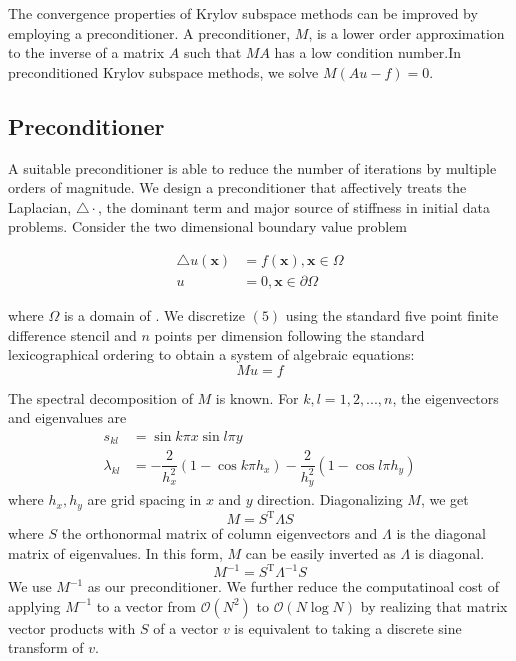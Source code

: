 \documentclass[12pt]{article}
\begin{document}
\begin{multicols}{2}
The convergence properties of Krylov subspace methods can be improved by employing a preconditioner. A preconditioner, $M$, is a lower order approximation to the inverse of a matrix $A$ such that $MA$ has a low condition number.In preconditioned Krylov subspace methods, we solve $M(Au-f)=0$.

\subsection{Preconditioner}
A suitable preconditioner is able to reduce the number of iterations by multiple orders of magnitude. We design a preconditioner that affectively treats the Laplacian, $\triangle\cdot$, the dominant term and major source of stiffness in initial data problems. Consider the two dimensional boundary value problem

\begin{align}
    \triangle u(\mathbf{x}) &= f(\mathbf{x}), \mathbf{x}\in\Omega \\
    u &= 0, \mathbf{x}\in\partial\Omega
\end{align}

where $\Omega$ is a domain of . We discretize $(5)$ using the standard five point finite difference stencil and $n$ points per dimension following the standard lexicographical ordering to obtain a system of algebraic equations:
\begin{equation}
    Mu = f
\end{equation}

The spectral decomposition of $M$ is known. For $k,l=1,2,...,n$, the eigenvectors and eigenvalues are
\begin{align}
    s_{kl} &= \sin{k\pi x}\sin{l\pi y} \\
    \lambda_{kl} &= -\dfrac{2}{h_x^2}(1-\cos{k\pi h_x}) -\dfrac{2}{h_y^2}(1-\cos{l\pi h_y})
\end{align}
where $h_x,h_y$ are grid spacing in $x$ and $y$ direction.
Diagonalizing $M$, we get
\begin{equation}
    M = S^\text{T} \Lambda S
\end{equation}
where $S$ the orthonormal matrix of column eigenvectors and $\Lambda$ is the diagonal matrix of eigenvalues. In this form, $M$ can be easily inverted as $\Lambda$ is diagonal.
\begin{equation}
    M^{-1} = S^\text{T}\Lambda^{-1}S
\end{equation}
We use $M^{-1}$ as our preconditioner. We further reduce the computatinoal cost of applying $M^{-1}$ to a vector from $\mathcal{O}(N^2)$ to $\mathcal{O}(N\log N)$ by realizing that matrix vector products with $S$ of a vector $v$ is equivalent to taking a discrete sine transform of $v$.


\end{multicols}
\end{document}
